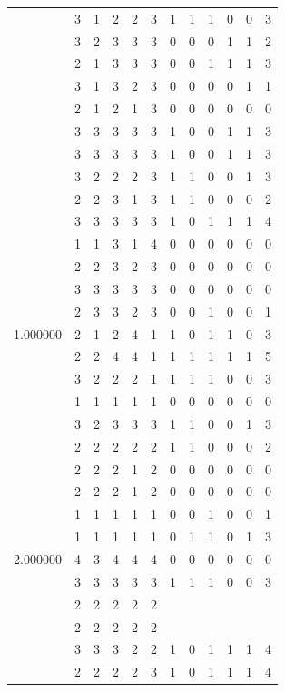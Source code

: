 \documentclass[]{book}
\theoremstyle{definition}
\theoremstyle{definition}
\theoremstyle{definition}
\theoremstyle{remark}
\begin{document}
\begin{table}
{\begin{tabular}[t]{rrrrrrrrrrrr}
 & 3 & 1 & 2 & 2 & 3 & 1 & 1 & 1 & 0 & 0 & 3\\
 & 3 & 2 & 3 & 3 & 3 & 0 & 0 & 0 & 1 & 1 & 2\\
 & 2 & 1 & 3 & 3 & 3 & 0 & 0 & 1 & 1 & 1 & 3\\
 & 3 & 1 & 3 & 2 & 3 & 0 & 0 & 0 & 0 & 1 & 1\\
 & 2 & 1 & 2 & 1 & 3 & 0 & 0 & 0 & 0 & 0 & 0\\
 & 3 & 3 & 3 & 3 & 3 & 1 & 0 & 0 & 1 & 1 & 3\\
 & 3 & 3 & 3 & 3 & 3 & 1 & 0 & 0 & 1 & 1 & 3\\
 & 3 & 2 & 2 & 2 & 3 & 1 & 1 & 0 & 0 & 1 & 3\\
 & 2 & 2 & 3 & 1 & 3 & 1 & 1 & 0 & 0 & 0 & 2\\
 & 3 & 3 & 3 & 3 & 3 & 1 & 0 & 1 & 1 & 1 & 4\\
 & 1 & 1 & 3 & 1 & 4 & 0 & 0 & 0 & 0 & 0 & 0\\
 & 2 & 2 & 3 & 2 & 3 & 0 & 0 & 0 & 0 & 0 & 0\\
 & 3 & 3 & 3 & 3 & 3 & 0 & 0 & 0 & 0 & 0 & 0\\
 & 2 & 3 & 3 & 2 & 3 & 0 & 0 & 1 & 0 & 0 & 1\\
1.000000 & 2 & 1 & 2 & 4 & 1 & 1 & 0 & 1 & 1 & 0 & 3\\
 & 2 & 2 & 4 & 4 & 1 & 1 & 1 & 1 & 1 & 1 & 5\\
 & 3 & 2 & 2 & 2 & 1 & 1 & 1 & 1 & 0 & 0 & 3\\
 & 1 & 1 & 1 & 1 & 1 & 0 & 0 & 0 & 0 & 0 & 0\\
 & 3 & 2 & 3 & 3 & 3 & 1 & 1 & 0 & 0 & 1 & 3\\
 & 2 & 2 & 2 & 2 & 2 & 1 & 1 & 0 & 0 & 0 & 2\\
 & 2 & 2 & 2 & 1 & 2 & 0 & 0 & 0 & 0 & 0 & 0\\
 & 2 & 2 & 2 & 1 & 2 & 0 & 0 & 0 & 0 & 0 & 0\\
 & 1 & 1 & 1 & 1 & 1 & 0 & 0 & 1 & 0 & 0 & 1\\
 & 1 & 1 & 1 & 1 & 1 & 0 & 1 & 1 & 0 & 1 & 3\\
2.000000 & 4 & 3 & 4 & 4 & 4 & 0 & 0 & 0 & 0 & 0 & 0\\
 & 3 & 3 & 3 & 3 & 3 & 1 & 1 & 1 & 0 & 0 & 3\\
 & 2 & 2 & 2 & 2 & 2 &  &  &  &  &  & \\
 & 2 & 2 & 2 & 2 & 2 &  &  &  &  &  & \\
 & 3 & 3 & 3 & 2 & 2 & 1 & 0 & 1 & 1 & 1 & 4\\
 & 2 & 2 & 2 & 2 & 3 & 1 & 0 & 1 & 1 & 1 & 4\\

\end{tabular}}
\end{table}
\end{document}
